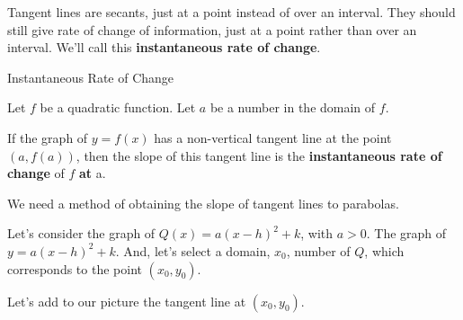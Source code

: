 \documentclass{ximera}
\begin{document}
Tangent lines are secants, just at a point instead of over an interval.  They should still give rate of change of information, just at a point rather than over an interval. We'll call this \textbf{instantaneous rate of change}.




\begin{definition} Instantaneous Rate of Change


Let $f$ be a quadratic function. Let $a$ be a number in the domain of $f$.

If the graph of $y = f(x)$ has a non-vertical tangent line at the point $(a, f(a))$, then the slope of this tangent line is the \textbf{instantaneous rate of change} of $f$ \textbf{at} a.


\end{definition}

We need a method of obtaining the slope of tangent lines to parabolas.




Let's consider the graph of $Q(x) = a (x - h)^2 + k$, with $a > 0$. The graph of $y = a (x - h)^2 + k$. And, let's select a domain, $x_0$, number of $Q$, which corresponds to the point $(x_0, y_0)$.

Let's add to our picture the tangent line at $(x_0, y_0)$.


\begin{image}
\end{image}
\end{document}
